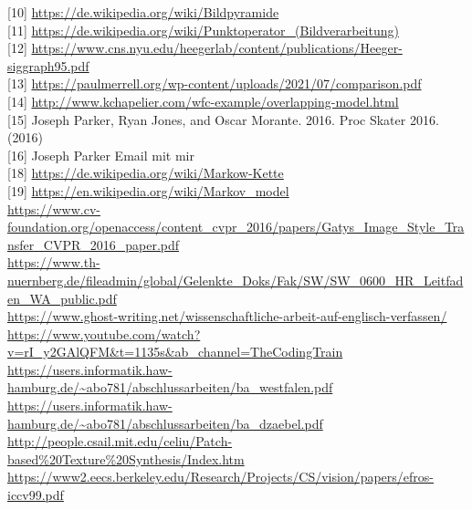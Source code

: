 \documentclass[12pt, a4paper,twoside,openright]{report}
\begin{document}
{[10]} \url{https://de.wikipedia.org/wiki/Bildpyramide}\\
{[11]} \url{https://de.wikipedia.org/wiki/Punktoperator_(Bildverarbeitung)}\\
{[12]} \url{https://www.cns.nyu.edu/heegerlab/content/publications/Heeger-siggraph95.pdf}\\
{[13]} \url{https://paulmerrell.org/wp-content/uploads/2021/07/comparison.pdf}\\
{[14]} \url{http://www.kchapelier.com/wfc-example/overlapping-model.html}\\
{[15]} {Joseph Parker, Ryan Jones, and Oscar Morante. 2016. Proc Skater 2016. (2016)}\\
{[16]} {Joseph Parker Email mit mir}\\
{[18]} \url{https://de.wikipedia.org/wiki/Markow-Kette}\\
{[19]} \url{https://en.wikipedia.org/wiki/Markov_model}\\
\url{https://www.cv-foundation.org/openaccess/content_cvpr_2016/papers/Gatys_Image_Style_Transfer_CVPR_2016_paper.pdf}\\
\url{https://www.th-nuernberg.de/fileadmin/global/Gelenkte_Doks/Fak/SW/SW_0600_HR_Leitfaden_WA_public.pdf}\\
\url{https://www.ghost-writing.net/wissenschaftliche-arbeit-auf-englisch-verfassen/}\\
\url{https://www.youtube.com/watch?v=rI_y2GAlQFM&t=1135s&ab_channel=TheCodingTrain}\\
\url{https://users.informatik.haw-hamburg.de/~abo781/abschlussarbeiten/ba_westfalen.pdf}\\
\url{https://users.informatik.haw-hamburg.de/~abo781/abschlussarbeiten/ba_dzaebel.pdf}\\
\url{http://people.csail.mit.edu/celiu/Patch-based%20Texture%20Synthesis/Index.htm}\\
\url{https://www2.eecs.berkeley.edu/Research/Projects/CS/vision/papers/efros-iccv99.pdf}\\
\end{document}
